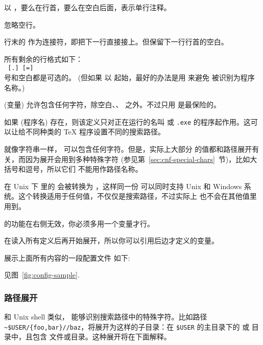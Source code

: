 \documentclass{article}
\begin{document}
\begin{itemize*}
  \item
  以 \code{\%}，要么在行首，要么在空白后面，表示单行注释。
  \item
  忽略空行。
  \item
  行末的 \bs{} 作为连接符，即把下一行直接接上。但保留下一行行首的空白。
  \item
  所有剩余的行格式如下：\\
  \hspace*{2em}\texttt{ \textrm{[}.\textrm{]}
  \textrm{[}=\textrm{]} }\\[1pt]
  \samp{=} 号和空白都是可选的。
  (但如果  以  起始，最好的办法是用 \samp{=} 来避免 
  被识别为程序名称。)
  \item
   (变量) 允许包含任何字符，除空白、\samp{=}、
  之外。不过只用  是最保险的。
  \item
  如果  (程序名) 存在，则该定义只对正在运行的名叫
  \texttt{} 或 \texttt{.exe}
  的程序起作用。这可以让给不同种类的 \TeX{} 程序设置不同的搜索路径。
  \item 就像字符串一样， 可以包含任何字符。但是，实际上大部分
   的值都和路径展开有关，而因为展开会用到多种特殊字符
  (参见第~\ref{sec:cnf-special-chars}~节)，比如大括号和逗号，所以它们
  不能用作路径名称。

  在 Unix 下  里的 \samp{;} 会被转换为 \samp{:}，这样同一份
   可以同时支持 Unix 和 Windows
  系统。这个转换适用于任何值，不仅仅是搜索路径，不过实际上 \samp{;}
  也不会在其他值里用到。

   的功能在右侧无效，你必须多用一个变量才行。
  \item
  在读入所有定义后再开始展开，所以你可以引用后边才定义的变量。
\end{itemize*}
展示上面所有内容的一段配置文件
\ifSingleColumn
  如下:

  
\else
  见图~\ref{fig:config-sample}.
\fi

\subsubsection{路径展开}
\label{sec:path-expansion}

和 Unix shell 类似，\KPS{} 能够识别搜索路径中的特殊字符。比如路径
\verb+~$USER/{foo,bar}//baz+，将展开为这样的子目录：在 \texttt{\$USER}
的主目录下的  或  目录中，且包含 
文件或目录。这种展开将在下面解释。
\end{document}
